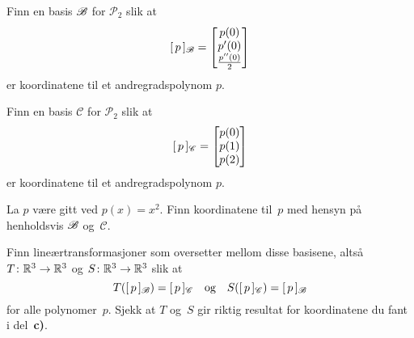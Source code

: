 \begin{oppgave}
\begin{punkt}
Finn en basis $\mathscr{B}$ for $\mathcal{P}_2$ slik at
\[
[\,{p}\,]_{\mathscr{B}}
 =
\begin{bmatrix} p(0) \\ p'(0) \\ \frac{p''(0)}{2} \end{bmatrix}
\]
er koordinatene til et andregradspolynom $p$.
\end{punkt}

\begin{punkt}
Finn en basis $\mathscr{C}$ for $\mathcal{P}_2$ slik at
\[
[\,{p}\,]_{\mathscr{C}}
 =
\begin{bmatrix} p(0) \\ p(1) \\ p(2) \end{bmatrix}
\]
er koordinatene til et andregradspolynom $p$.
\end{punkt}

\begin{punkt}
La $p$ være gitt ved $p(x) = x^2$.
Finn koordinatene til~$p$ med hensyn på henholdsvis $\mathscr{B}$ og~$\mathscr{C}$.
\end{punkt}

\begin{punkt}
Finn lineærtransformasjoner som oversetter mellom disse basisene,
altså
$T \colon \mathbb{R}^3 \to \mathbb{R}^3$ og
$S \colon \mathbb{R}^3 \to \mathbb{R}^3$
slik at
\[
T( [\,{p}\,]_{\mathscr{B}} ) = [\,{p}\,]_{\mathscr{C}}
\quad\text{og}\quad
S( [\,{p}\,]_{\mathscr{C}} ) = [\,{p}\,]_{\mathscr{B}}
\]
for alle polynomer~$p$.
Sjekk at $T$ og~$S$ gir riktig resultat for koordinatene du fant i
del~\textbf{c)}.
\end{punkt}

\end{oppgave}

